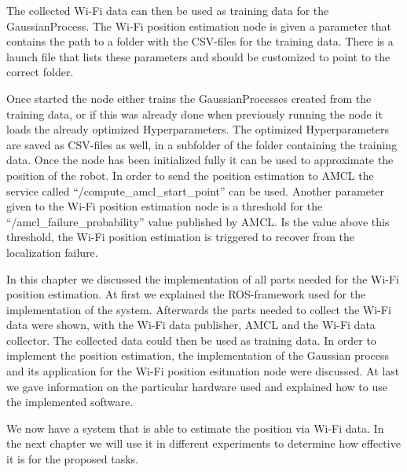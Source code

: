 The collected Wi-Fi data can then be used as training data for the \Gls{GaussianProcess}. The Wi-Fi position estimation node is given a parameter that contains the path to a folder with the CSV-files for the training data. There is a launch file that lists these parameters and should be customized to point to the correct folder.

Once started the node either trains the \Gls{GaussianProcess}es created from the training data, or if this was already done when previously running the node it loads the already optimized \gls{Hyperparameter}s. The optimized \gls{Hyperparameter}s are saved as CSV-files as well, in a subfolder of the folder containing the training data. Once the node has been initialized fully it can be used to approximate the position of the robot. In order to send the position estimation to AMCL the service called ``/compute\_amcl\_start\_point'' can be used. Another parameter given to the Wi-Fi position estimation node is a threshold for the ``/amcl\_failure\_probability'' value published by AMCL. Is the value above this threshold, the Wi-Fi position estimation is triggered to recover from the localization failure. 

In this chapter we discussed the implementation of all parts needed for the Wi-Fi position estimation. At first we explained the ROS-framework used for the implementation of the system. Afterwards the parts needed to collect the Wi-Fi data were shown, with the Wi-Fi data publisher, AMCL and the Wi-Fi data collector. The collected data could then be used as training data. In order to implement the position estimation, the implementation of the Gaussian process and its application for the Wi-Fi position esitmation node were discussed. At last we gave information on the particular hardware used and explained how to use the implemented software. 

We now have a system that is able to estimate the position via Wi-Fi data. In the next chapter we will use it in different experiments to determine how effective it is for the proposed tasks. 